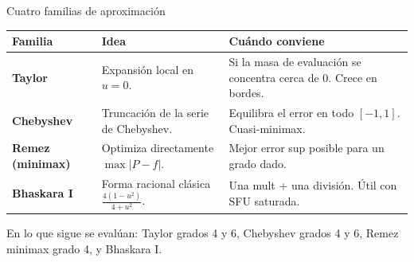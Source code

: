 \documentclass[aspectratio=169,10pt]{beamer}
\begin{document}
\begin{frame}{Cuatro familias de aproximación}
  \footnotesize
  \begin{tabular}{>{\bfseries}p{2.4cm} p{4.0cm} p{6.0cm}}
    \toprule
    Familia & Idea & Cuándo conviene \\
    \midrule
    Taylor       & Expansión local en $u=0$.
                 & Si la masa de evaluación se concentra cerca de 0.
                   Crece en bordes. \\
    Chebyshev    & Truncación de la serie de Chebyshev.
                 & Equilibra el error en todo $[-1,1]$. Cuasi-minimax. \\
    Remez (minimax) & Optimiza directamente $\max|P-f|$.
                 & Mejor error sup posible para un grado dado. \\
    Bhaskara I   & Forma racional clásica $\frac{4(1-u^{2})}{4+u^{2}}$.
                 & Una mult + una división. Útil con SFU saturada. \\
    \bottomrule
  \end{tabular}
  \vspace{6pt}

  \begin{tcolorbox}[colback=LPurple, colframe=Purple, fontupper=\footnotesize]
    En lo que sigue se evalúan: Taylor grados 4 y 6, Chebyshev grados 4
    y 6, Remez minimax grado 4, y Bhaskara I.
  \end{tcolorbox}
\end{frame}
\end{document}
